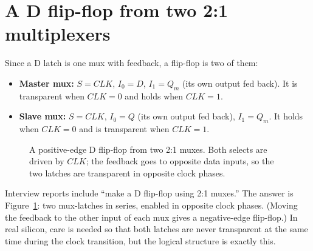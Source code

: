 \section{A D flip-flop from two 2:1 multiplexers}
\label{sec:ffmux}

Since a D latch is one mux with feedback, a flip-flop is two of them:

\begin{itemize}
  \item \textbf{Master mux:} $S = CLK$, $I_0 = D$, $I_1 = Q_m$ (its own output fed back). It is transparent when $CLK = 0$ and holds when $CLK = 1$.
  \item \textbf{Slave mux:} $S = CLK$, $I_0 = Q$ (its own output fed back), $I_1 = Q_m$. It holds when $CLK = 0$ and is transparent when $CLK = 1$.
\end{itemize}

\begin{figure}[h]
\centering
{}
\caption{A positive-edge D flip-flop from two 2:1 muxes. Both selects are driven by $CLK$; the feedback goes to opposite data inputs, so the two latches are transparent in opposite clock phases.}
\label{fig:ffmux}
\end{figure}

\begin{onoa}
Interview reports include ``make a D flip-flop using 2:1 muxes.'' The answer is Figure~\ref{fig:ffmux}: two mux-latches in series, enabled in opposite clock phases. (Moving the feedback to the other input of each mux gives a negative-edge flip-flop.) In real silicon, care is needed so that both latches are never transparent at the same time during the clock transition, but the logical structure is exactly this.
\end{onoa}

